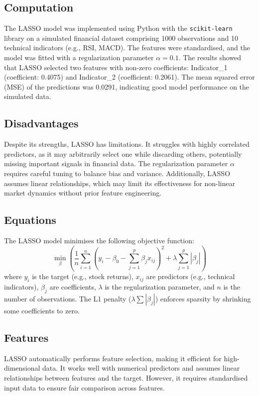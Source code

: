 \documentclass{article}
\begin{document}
\subsection{Computation}
The LASSO model was implemented using Python with the \texttt{scikit-learn} library on a simulated financial dataset comprising 1000 observations and 10 technical indicators (e.g., RSI, MACD). The features were standardised, and the model was fitted with a regularization parameter \(\alpha = 0.1\). The results showed that LASSO selected two features with non-zero coefficients: Indicator\_1 (coefficient: 0.4075) and Indicator\_2 (coefficient: 0.2061). The mean squared error (MSE) of the predictions was 0.0291, indicating good model performance on the simulated data.

\subsection{Disadvantages}
Despite its strengths, LASSO has limitations. It struggles with highly correlated predictors, as it may arbitrarily select one while discarding others, potentially missing important signals in financial data. The regularization parameter \(\alpha\) requires careful tuning to balance bias and variance. Additionally, LASSO assumes linear relationships, which may limit its effectiveness for non-linear market dynamics without prior feature engineering.

\subsection{Equations}
The LASSO model minimises the following objective function:
\[
\min_{\beta} \left( \frac{1}{n} \sum_{i=1}^n (y_i - \beta_0 - \sum_{j=1}^p \beta_j x_{ij})^2 + \lambda \sum_{j=1}^p |\beta_j| \right)
\]
where \(y_i\) is the target (e.g., stock returns), \(x_{ij}\) are predictors (e.g., technical indicators), \(\beta_j\) are coefficients, \(\lambda\) is the regularization parameter, and \(n\) is the number of observations. The L1 penalty (\(\lambda \sum |\beta_j|\)) enforces sparsity by shrinking some coefficients to zero.

\subsection{Features}
LASSO automatically performs feature selection, making it efficient for high-dimensional data. It works well with numerical predictors and assumes linear relationships between features and the target. However, it requires standardised input data to ensure fair comparison across features.
\end{document}

